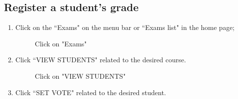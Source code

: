 \documentclass[ManualeUtente]{subfiles}
\begin{document}
\subsection{Register a student's grade}
\begin{enumerate}
	\item Click on the \textquotedblleft Exams" on the menu bar or \textquotedblleft Exams list" in the home page;
	\begin{figure}[H]
		\centering
		\caption{Click on "Exams"}
		\label{fig:Click on "Exams"}
	\end{figure}
	\item Click \textquotedblleft VIEW STUDENTS" related to the desired course.
	\begin{figure}[H]
		\centering
		\caption{Click on "VIEW STUDENTS"}
		\label{fig:Click on "VIEW STUDENTS"}
	\end{figure}
	\item Click \textquotedblleft SET VOTE" related to the desired student.
	\begin{figure}[H]
		\centering

\end{figure}
\end{enumerate}
\end{document}
